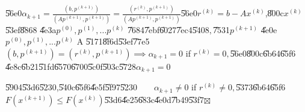 \documentclass{article}
\begin{document}
\U{56e0}$\alpha _{k+1}=\frac{\left( b,p^{\left( k+1\right) }\right) }{\left(
Ap^{\left( k+1\right) },p^{\left( k+1\right) }\right) }=\frac{\left(
r^{\left( k\right) },p^{\left( k+1\right) }\right) }{\left( Ap^{\left(
k+1\right) },p^{\left( k+1\right) }\right) }$\U{56e0}$r^{\left( k\right)
}=b-Ax^{\left( k\right) }$,\U{800c}$x^{\left( k\right) }$\U{53ef}\U{8868}%
\U{4e3a}$p^{\left( 0\right) },p^{\left( 1\right) },...p^{\left( k\right) }$%
\U{7684}\U{7ebf}\U{6027}\U{7ec4}\U{5408}$,$\U{7531}$p^{\left( k+1\right) }$%
\U{4e0e}$p^{\left( 0\right) },p^{\left( 1\right) },...p^{\left( k\right) }$ A%
\U{5171}\U{8f6d}\U{53ef}\U{77e5}$\left( b,p^{\left( k+1\right) }\right)
=\left( r^{\left( k\right) },p^{\left( k+1\right) }\right) \implies \alpha
_{k+1}=0$ if $r^{\left( k\right) }=0,$\U{56e0}\U{800c}\U{6b64}\U{65f6}%
\U{4e8c}\U{6b21}\U{51fd}\U{6570}\U{6700}\U{5c0f}\U{503c}\U{5728}$\alpha
_{k+1}=0$

\U{5904}\U{53d6}\U{5230},\U{540c}\U{65f6}\U{4e5f}\U{5f97}\U{5230}$\qquad
\alpha _{k+1}\neq 0$ if $r^{\left( k\right) }\neq 0,$\U{5373}\U{6b64}\U{65f6}%
$F\left( x^{\left( k+1\right) }\right) \leq F\left( x^{\left( k\right)
}\right) $\U{53d6}\U{4e25}\U{683c}\U{4e0d}\U{7b49}\U{53f7}$\boxtimes $
\end{document}
